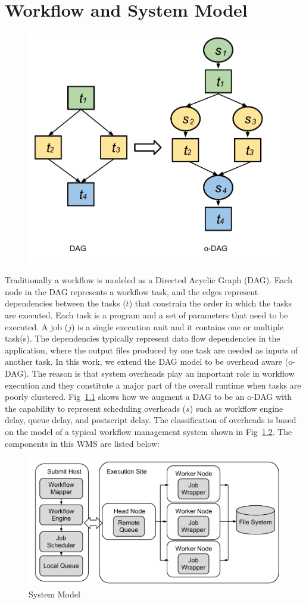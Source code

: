 \chapter{Workflow and System Model}

\begin{figure}[h!]
\includegraphics[width=0.6\linewidth]{figures/introduction/odag.pdf}
\centering
  \label{fig:intro_odag}
\end{figure}

Traditionally a workflow is modeled as a Directed Acyclic Graph (DAG). Each node in the DAG represents a workflow task, and the edges represent dependencies between the tasks ($t$) that constrain the order in which the tasks are executed. Each task is a program and a set of parameters that need to be executed. A job ($j$) is a single execution unit and it contains one or multiple task(s). The dependencies typically represent data flow dependencies in the application, where the output files produced by one task are needed as inputs of another task. In this work, we extend the DAG model to be overhead aware (o-DAG). The reason is that system overheads play an important role in workflow execution and they constitute a major part of the overall runtime when tasks are poorly clustered. Fig~\ref{fig:intro_odag} shows how we augment a DAG to be an o-DAG with the capability to represent scheduling overheads ($s$) such as workflow engine delay, queue delay, and postscript delay. The classification of overheads is based on the model of a typical workflow management system shown in Fig~\ref{fig:intro_system}. The components in this WMS are listed below: 

\begin{figure}[h!]
\centering
  \includegraphics[width=0.7\linewidth]{figures/introduction/model.pdf}

  \caption{System Model}
  \label{fig:intro_system}
\end{figure}


